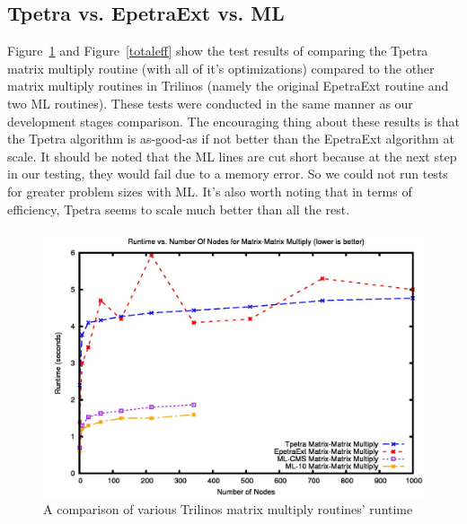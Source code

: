 \documentclass{article}
\begin{document}
\subsection{Tpetra vs. EpetraExt vs. ML}
Figure~\ref{totaltime} and Figure~\ref{totaleff} show the test results of comparing the Tpetra matrix multiply routine 
(with all of it's optimizations) compared to the other matrix multiply routines in Trilinos (namely the original EpetraExt 
routine and two ML routines). These tests were conducted in the same manner as our development stages comparison. 
The encouraging thing about these results is that the Tpetra algorithm is as-good-as if not better than the EpetraExt 
algorithm at scale. It should be noted that the ML lines are cut short because at the next step in our testing, 
they would fail due to a memory error. So we could not run tests for greater problem sizes with ML. It's also worth noting
that in terms of efficiency, Tpetra seems to scale much better than all the rest.

\begin{figure}
\includegraphics[scale=.4]{totaltime.jpg}
\caption[Time Comparison]{A comparison of various Trilinos matrix multiply routines' runtime}
\label{totaltime}
\end{figure}
\end{document}
